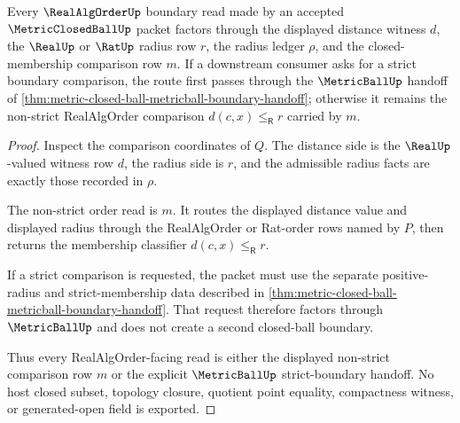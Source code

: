 \begin{theorem}
\label{thm:metricclosedball-realalgorder-boundary}
Every $\RealAlgOrderUp$ boundary read made by an accepted $\MetricClosedBallUp$ packet factors through the displayed distance witness $d$, the $\RealUp$ or $\RatUp$ radius row $r$, the radius ledger $\rho$, and the closed-membership comparison row $m$. If a downstream consumer asks for a strict boundary comparison, the route first passes through the $\MetricBallUp$ handoff of \autoref{thm:metric-closed-ball-metricball-boundary-handoff}; otherwise it remains the non-strict RealAlgOrder comparison $d(c,x)\leq_{\mathsf R}r$ carried by $m$.
\end{theorem}
\begin{proof}
Inspect the comparison coordinates of $Q$. The distance side is the $\RealUp$-valued witness row $d$, the radius side is $r$, and the admissible radius facts are exactly those recorded in $\rho$.

The non-strict order read is $m$. It routes the displayed distance value and displayed radius through the RealAlgOrder or Rat-order rows named by $P$, then returns the membership classifier $d(c,x)\leq_{\mathsf R}r$.

If a strict comparison is requested, the packet must use the separate positive-radius and strict-membership data described in \autoref{thm:metric-closed-ball-metricball-boundary-handoff}. That request therefore factors through $\MetricBallUp$ and does not create a second closed-ball boundary.

Thus every RealAlgOrder-facing read is either the displayed non-strict comparison row $m$ or the explicit $\MetricBallUp$ strict-boundary handoff. No host closed subset, topology closure, quotient point equality, compactness witness, or generated-open field is exported.
\end{proof}

